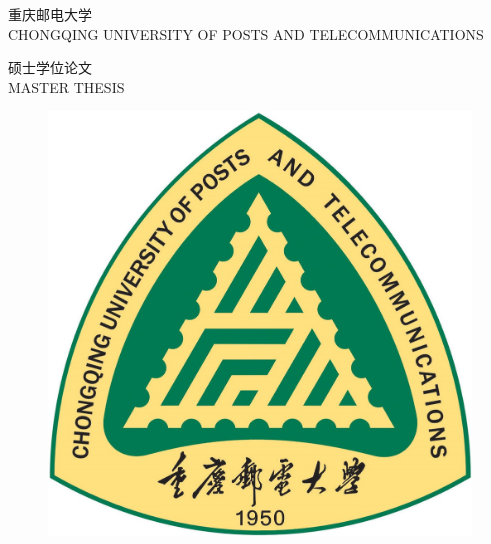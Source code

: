 \quad
\vspace{-3mm}

\begin{center}



\erhaod 重\hspace{11pt}庆\hspace{11pt}邮\hspace{11pt}电\hspace{11pt}大\hspace{11pt}学\\[1mm]
\xiaosid CHONGQING UNIVERSITY OF POSTS AND TELECOMMUNICATIONS\\
\vspace{14mm}


\chuhaod 硕士学位论文\\
\sanhaod MASTER THESIS



\vspace{13mm}

        
        \begin{figure}[h]
        	\centering
        	\includegraphics[scale=0.475]{chapters/logo2.jpg}
        \end{figure}
\end{center}

